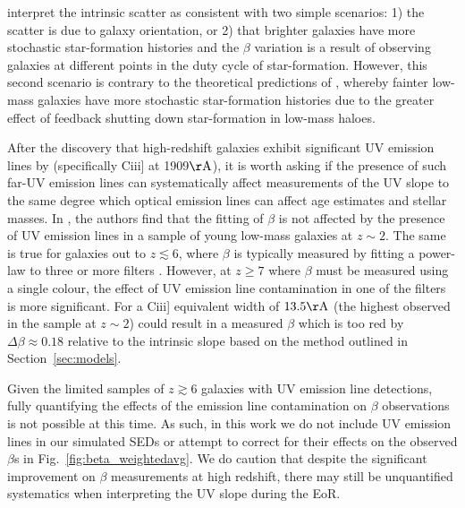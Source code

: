 \citeauthor{Rogers:2014bn} interpret the intrinsic scatter as consistent with two simple scenarios: 1) the scatter is due to galaxy orientation, or 2) that brighter galaxies have more stochastic star-formation histories and the $\beta$ variation is a result of observing galaxies at different points in the duty cycle of star-formation. However, this second scenario is contrary to the theoretical predictions of \citet{Dayal:2013jm}, whereby fainter low-mass galaxies have more stochastic star-formation histories due to the greater effect of feedback shutting down star-formation in low-mass haloes.
 
After the discovery that high-redshift galaxies exhibit significant UV emission lines by \citet{Stark:2014vc} (specifically {\sc Ciii]} at 1909$\rm{\AA}$), it is worth asking if the presence of such far-UV emission lines can systematically affect measurements of the UV slope to the same degree which optical emission lines can affect age estimates and stellar masses. In \citet{Stark:2014fa}, the authors find that the fitting of $\beta$ is not affected by the presence of UV emission lines in a sample of young low-mass galaxies at $z\sim2$. The same is true for galaxies out to $z \lesssim 6$, where $\beta$ is typically measured by fitting a power-law to three or more filters \citep{Bouwens:2013vf}. However, at $z \geq 7$ where $\beta$ must be measured using a single colour, the effect of UV emission line contamination in one of the filters is more significant. For a {\sc Ciii]} equivalent width of $13.5\rm{\AA}$ (the highest observed in the \citet{Stark:2014fa} sample at $z\sim2$) could result in a measured $\beta$ which is too red by $\Delta\beta \approx 0.18$ relative to the intrinsic slope based on the method outlined in Section~\ref{sec:models}. 

Given the limited samples of $z\gtrsim 6$ galaxies with UV emission line detections, fully quantifying the effects of the emission line contamination on $\beta$ observations is not possible at this time. As such, in this work we do not include UV emission lines in our simulated SEDs or attempt to correct for their effects on the observed $\beta$s in Fig.~\ref{fig:beta_weightedavg}. We do caution that despite the significant improvement on  $\beta$ measurements at high redshift, there may still be unquantified systematics when interpreting the UV slope during the EoR.

